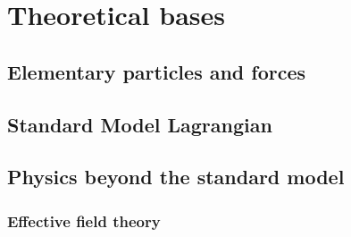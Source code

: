 

\tableofcontents*
{}  %
\newpage



\mainmatter
\chapter[An introduction to the theory]{Theoretical bases}



\section{Elementary particles and forces}
\section{Standard Model Lagrangian}
\section{Physics beyond the standard model}
\subsection{Effective field theory}
